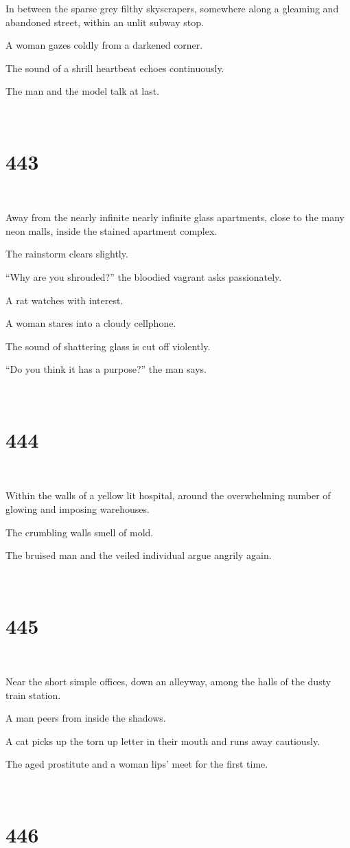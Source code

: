 \documentclass{report}
\begin{document}
In between the sparse grey filthy skyscrapers, somewhere along a gleaming and abandoned street, within an unlit subway stop.

A woman gazes coldly from a darkened corner.

The sound of a shrill heartbeat echoes continuously.

The man and the model talk at last.

~
\chapter*{443}
~

Away from the nearly infinite nearly infinite glass apartments, close to the many neon malls, inside the stained apartment complex.

The rainstorm clears slightly.

``Why are you shrouded?'' the bloodied vagrant asks passionately.

A rat watches with interest.

A woman stares into a cloudy cellphone.

The sound of shattering glass is cut off violently.

``Do you think it has a purpose?'' the man says.

~
\chapter*{444}
~

Within the walls of a yellow lit hospital, around the overwhelming number of glowing and imposing warehouses.

The crumbling walls smell of mold.

The bruised man and the veiled individual argue angrily again.

~
\chapter*{445}
~

Near the short simple offices, down an alleyway, among the halls of the dusty train station.

A man peers from inside the shadows.

A cat picks up the torn up letter in their mouth and runs away cautiously.

The aged prostitute and a woman lips' meet for the first time.

~
\chapter*{446}
~
\end{document}
